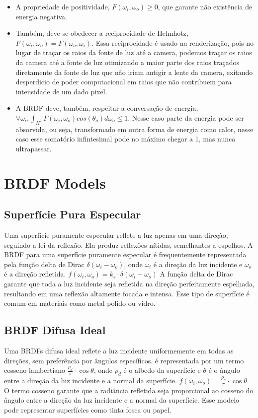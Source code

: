 \documentclass[english, 
               brazil, 
               bsc] %
               {dcomp-abntex2}
\begin{document}
\begin{itemize}
  \item A propriedade de positividade, $ F(\omega_i, \omega_o) \geq 0 $, que garante não existência de energia negativa. 

  \item Também, deve-se obedecer a reciprocidade de Helmhotz, $F(\omega_i, \omega_o) = F(\omega_o, \omega_i)$. Essa reciprocidade é usado na renderização, pois no lugar de traçar os raios da fonte de luz até a camera, podemos traçar os raios da camera até a fonte de luz otimizando a maior parte dos raios traçados diretamente da fonte de luz que não iriam antigir a lente da camera, exitando desperdicio de poder computacional em raios que não contribuem para intensidade de um dado pixel.

  \item A BRDF deve, também, respeitar a conversação de energia, $\forall  \omega_i, \int_{H^2}{F(\omega_i, \omega_o)cos(\theta_o) d\omega_o}\leq 1$. Nesse caso parte da energia pode ser absorvida, ou seja, transformado em outra forma de energia como calor, nesse caso esse somatório infintesimal pode no máximo chegar a 1, mas nunca ultrapassar.
\end{itemize}

\section{BRDF Models} \label{brdfmodels}


\subsection{Superfície Pura Especular}
Uma superfície puramente especular reflete a luz apenas em uma direção, seguindo a lei da reflexão. Ela produz reflexões nítidas, semelhantes a espelhos.
A BRDF para uma superfície puramente especular é frequentemente representada pela função delta de Dirac $\delta(\omega_i - \omega_o)$, onde $\omega_i$ é a direção da luz incidente e $\omega_o$ é a direção refletida.
$f(\omega_i, \omega_o) = k_s \cdot \delta(\omega_i - \omega_o)$
A função delta de Dirac garante que toda a luz incidente seja refletida na direção perfeitamente espelhada, resultando em uma reflexão altamente focada e intensa. Esse tipo de superfície é comum em materiais como metal polido ou vidro.

\subsection{BRDF Difusa Ideal}
Uma BRDFs difusa ideal reflete a luz incidente uniformemente em todas as direções, sem preferência por ângulos específicos. é representada por um termo cosseno lambertiano $\frac{\rho_d}{\pi} \cdot \cos \theta$, onde $\rho_d$ é o albedo da superfície e $\theta$ é o ângulo entre a direção da luz incidente e a normal da superfície.
$f(\omega_i, \omega_o) = \frac{\rho_d}{\pi} \cdot \cos \theta$
O termo cosseno garante que a radiância refletida seja proporcional ao cosseno do ângulo entre a direção da luz incidente e a normal da superfície. Esse modelo pode representar superfícies como tinta fosca ou papel.
\end{document}
